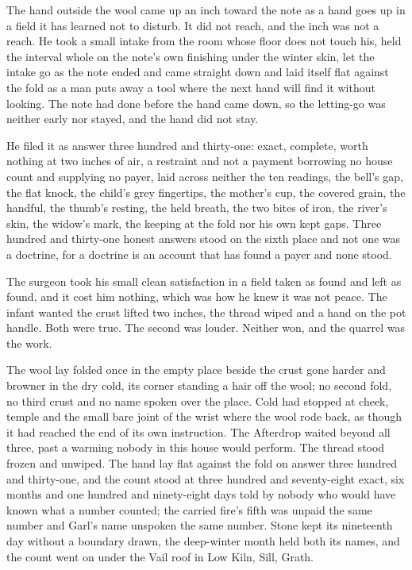 The hand outside the wool came up an inch toward the note as a hand goes up in a field it has learned not to disturb. It did not reach, and the inch was not a reach. He took a small intake from the room whose floor does not touch his, held the interval whole on the note's own finishing under the winter skin, let the intake go as the note ended and came straight down and laid itself flat against the fold as a man puts away a tool where the next hand will find it without looking. The note had done before the hand came down, so the letting-go was neither early nor stayed, and the hand did not stay.

He filed it as answer three hundred and thirty-one: exact, complete, worth nothing at two inches of air, a restraint and not a payment borrowing no house count and supplying no payer, laid across neither the ten readings, the bell's gap, the flat knock, the child's grey fingertips, the mother's cup, the covered grain, the handful, the thumb's resting, the held breath, the two bites of iron, the river's skin, the widow's mark, the keeping at the fold nor his own kept gaps. Three hundred and thirty-one honest answers stood on the sixth place and not one was a doctrine, for a doctrine is an account that has found a payer and none stood.

The surgeon took his small clean satisfaction in a field taken as found and left as found, and it cost him nothing, which was how he knew it was not peace. The infant wanted the crust lifted two inches, the thread wiped and a hand on the pot handle. Both were true. The second was louder. Neither won, and the quarrel was the work.

The wool lay folded once in the empty place beside the crust gone harder and browner in the dry cold, its corner standing a hair off the wool; no second fold, no third crust and no name spoken over the place. Cold had stopped at cheek, temple and the small bare joint of the wrist where the wool rode back, as though it had reached the end of its own instruction. The Afterdrop waited beyond all three, past a warming nobody in this house would perform. The thread stood frozen and unwiped. The hand lay flat against the fold on answer three hundred and thirty-one, and the count stood at three hundred and seventy-eight exact, six months and one hundred and ninety-eight days told by nobody who would have known what a number counted; the carried fire's fifth was unpaid the same number and Garl's name unspoken the same number. Stone kept its nineteenth day without a boundary drawn, the deep-winter month held both its names, and the count went on under the Vail roof in Low Kiln, Sill, Grath.
